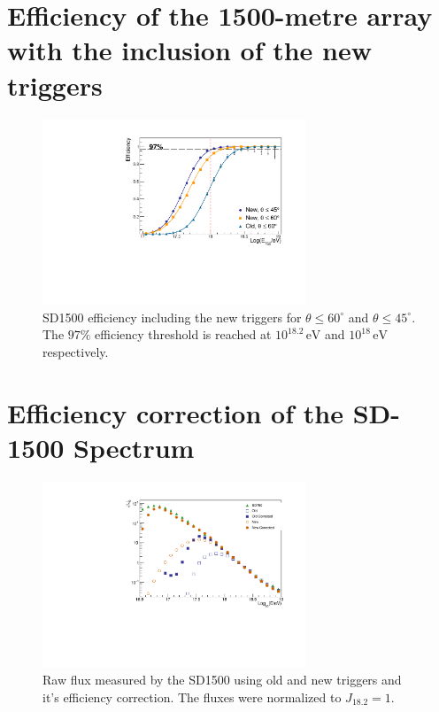 \documentclass[12pt,a4paper]{article}
\newcommand{\eV}{\, \mathrm{eV}}
\begin{document}
\section{Efficiency of the 1500-metre array with the inclusion of the new triggers}
\label{sec:new}

\begin{figure}[h]
    \begin{center}
        \includegraphics[width=0.7\textwidth]{plots/NewCut.pdf}
        \caption{SD1500 efficiency including the new triggers for $\theta\leq60^\circ$ and $\theta\leq45^\circ$. The $97\%$ efficiency threshold is reached at $10^{18.2}\eV$ and $10^{18}\eV$ respectively.
        \label{fig:NewCut}}
    \end{center}
\end{figure}


\section{Efficiency correction of the SD-1500 Spectrum}
\label{sec:spectrum}


\begin{figure}[hb]
    \begin{center}
        \includegraphics[width=0.7\textwidth]{plots/spectrum.pdf}
        \caption{Raw flux measured by the SD1500 using old and new triggers and it's efficiency correction. The fluxes were normalized to $J_{18.2}=1$.
        \label{fig:flux}}
    \end{center}
\end{figure}
\end{document}
